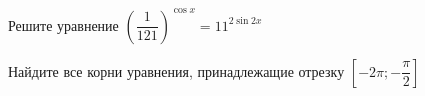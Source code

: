 \begin{ex}
	\begin{condition}
		\begin{enumcols}[label=\asbuk*)]
			\item Решите уравнение \( \left(\dfrac{1}{121}\right)^{\cos x} =11^{2\sin 2x} \)
			\item Найдите все корни уравнения, принадлежащие отрезку \( \left[-2\pi;-\dfrac{\pi}{2}\right] \)
		\end{enumcols}
	\end{condition}
\end{ex}